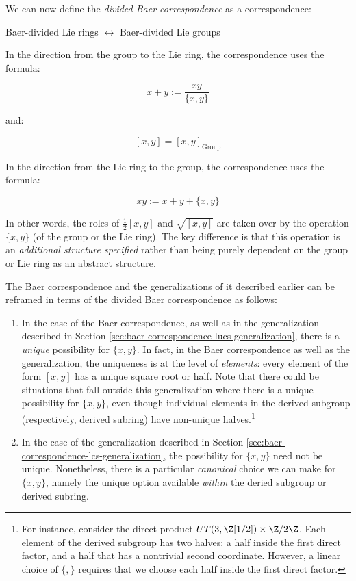\documentclass{ucetd}
\begin{document}
We can now define the {\em divided Baer correspondence} as a
correspondence:

\begin{center}
  Baer-divided Lie rings $\leftrightarrow$ Baer-divided Lie groups
\end{center}

In the direction from the group to the Lie ring, the correspondence
uses the formula:

$$x + y := \frac{xy}{\{ x,y \}}$$

and:

$$[x,y] = [x,y]_{\text{Group}}$$

In the direction from the Lie ring to the group, the correspondence
uses the formula:

$$xy := x + y + \{ x, y \}$$

In other words, the roles of $\frac{1}{2}[x,y]$ and $\sqrt{[x,y]}$ are
taken over by the operation $\{x, y\}$ (of the group or the Lie
ring). The key difference is that this operation is an {\em additional
  structure specified} rather than being purely dependent on the group
or Lie ring as an abstract structure. 

The Baer correspondence and the generalizations of it described
earlier can be reframed in terms of the divided Baer correspondence as
follows:

\begin{enumerate}
\item In the case of the Baer correspondence, as well as in the
  generalization described in Section
  \ref{sec:baer-correspondence-lucs-generalization}, there is a {\em
    unique} possibility for $\{ x, y \}$. In fact, in the Baer
  correspondence as well as the generalization, the uniqueness is at
  the level of {\em elements}: every element of the form $[x,y]$ has a
  unique square root or half. Note that there could be situations that
  fall outside this generalization where there is a unique possibility
  for $\{ x,y \}$, even though individual elements in the derived
  subgroup (respectively, derived subring) have non-unique
  halves.\footnote{For instance, consider the direct product
    $UT(3,\Z[1/2]) \times \Z/2\Z$. Each element of the derived
    subgroup has two halves: a half inside the first direct factor,
    and a half that has a nontrivial second coordinate. However, a
    linear choice of $\{ , \}$ requires that we choose each half
    inside the first direct factor.}
\item In the case of the generalization described in Section
  \ref{sec:baer-correspondence-lcs-generalization}, the possibility
  for $\{ x, y\}$ need not be unique. Nonetheless, there is a
  particular {\em canonical} choice we can make for $\{ x, y\}$,
  namely the unique option available {\em within} the deried subgroup
  or derived subring.
\end{enumerate}
\end{document}
